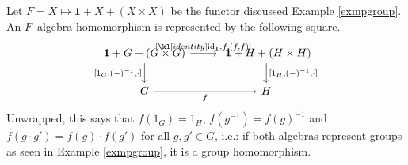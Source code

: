 \documentclass[main.tex]{subfiles}
\begin{document}
\begin{exmp}
	Let $F = X \mapsto \mathbf{1} + X + (X\times X)$ be the functor discussed Example \ref{exmpgroup}. An $F$--algebra homomorphism is represented by the following square.
	\begin{equation}\label{diag-homgroup}
		\centering
		\begin{tikzcd}
			\mathbf{1}+G+(G\times G) \arrow[d, "{[1_G,(-)^{-1},\cdot]}"'] \arrow[r, "{[\id_{\mathbf{1}},f,(f,f)]}"] & \ \mathbf{1}+H+(H\times H) \arrow[d, "{[1_H,(-)^{-1}, \cdot]}"] \\
			G \arrow[r, "f"']                           & H                       
		\end{tikzcd}
	\end{equation}
	Unwrapped, this says that $f(1_G) = 1_H$, $f(g^{-1}) = f(g)^{-1}$ and $f(g\cdot g') = f(g)\cdot f(g')$ for all $g,g' \in G$, i.e.: if both algebras represent groups as seen in Example \ref{exmpgroup}, it is a group homomorphism.
\end{exmp}
\end{document}
